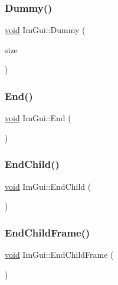 \mbox{\label{namespaceImGui_a8b0fb07113251301ff897b8578a53f34}} 
\subsubsection{\texorpdfstring{Dummy()}{Dummy()}}
{\footnotesize\ttfamily \hyperlink{imgui__impl__opengl3__loader_8h_ac668e7cffd9e2e9cfee428b9b2f34fa7}{void} Im\+Gui\+::\+Dummy (\begin{DoxyParamCaption}\item[{const \hyperlink{structImVec2}{Im\+Vec2} \&}]{size }\end{DoxyParamCaption})}

\mbox{\label{namespaceImGui_a5479d93794a004c67ceb6d13f37c8254}} 
\subsubsection{\texorpdfstring{End()}{End()}}
{\footnotesize\ttfamily \hyperlink{imgui__impl__opengl3__loader_8h_ac668e7cffd9e2e9cfee428b9b2f34fa7}{void} Im\+Gui\+::\+End (\begin{DoxyParamCaption}{ }\end{DoxyParamCaption})}

\mbox{\label{namespaceImGui_af8de559a88c1442d6df8c1b04c86e997}} 
\subsubsection{\texorpdfstring{End\+Child()}{EndChild()}}
{\footnotesize\ttfamily \hyperlink{imgui__impl__opengl3__loader_8h_ac668e7cffd9e2e9cfee428b9b2f34fa7}{void} Im\+Gui\+::\+End\+Child (\begin{DoxyParamCaption}{ }\end{DoxyParamCaption})}

\mbox{\label{namespaceImGui_ac4bd9024554b5074805bc0ce3076c514}} 
\subsubsection{\texorpdfstring{End\+Child\+Frame()}{EndChildFrame()}}
{\footnotesize\ttfamily \hyperlink{imgui__impl__opengl3__loader_8h_ac668e7cffd9e2e9cfee428b9b2f34fa7}{void} Im\+Gui\+::\+End\+Child\+Frame (\begin{DoxyParamCaption}{ }\end{DoxyParamCaption})}

